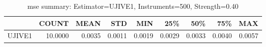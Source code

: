\begin{table}[ht]
\centering
\caption{mse summary: Estimator=UJIVE1, Instruments=500, Strength=0.40}
\begin{tabular}{lrrrrrrrr}
\toprule
 & COUNT & MEAN & STD & MIN & 25\% & 50\% & 75\% & MAX \\
\midrule
UJIVE1 & 10.0000 & 0.0035 & 0.0011 & 0.0019 & 0.0029 & 0.0033 & 0.0040 & 0.0057 \\
\bottomrule
\end{tabular}
\end{table}
